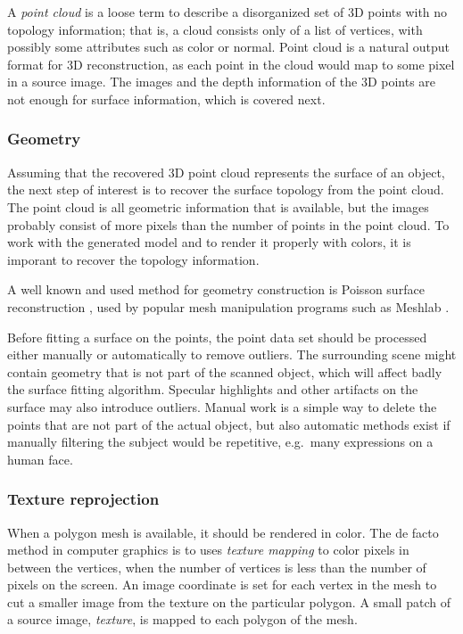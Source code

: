 A \emph{point cloud} is a loose term to describe a disorganized set of 3D points with no topology information; that is, a cloud consists only of a list of vertices, with possibly some attributes such as color or normal.
Point cloud is a natural output format for 3D reconstruction, as each point in the cloud would map to some pixel in a source image.
The images and the depth information of the 3D points are not enough for surface information, which is covered next.


\subsubsection{Geometry} %

Assuming that the recovered 3D point cloud represents the surface of an object, the next step of interest is to recover the surface topology from the point cloud.
The point cloud is all geometric information that is available, but the images probably consist of more pixels than the number of points in the point cloud.
To work with the generated model and to render it properly with colors, it is imporant to recover the topology information.

A well known and used method for geometry construction is Poisson surface reconstruction \cite{kazhdan2013screened}, used by popular mesh manipulation programs such as Meshlab \cite{meshlab}.

Before fitting a surface on the points, the point data set should be processed either manually or automatically to remove outliers.
The surrounding scene might contain geometry that is not part of the scanned object, which will affect badly the surface fitting algorithm.
Specular highlights and other artifacts on the surface may also introduce outliers.
Manual work is a simple way to delete the points that are not part of the actual object, but also automatic methods exist if manually filtering the subject would be repetitive, e.g.\ many expressions on a human face.



\subsubsection{Texture reprojection} %

When a polygon mesh is available, it should be rendered in color.
The de facto method in computer graphics is to uses \emph{texture mapping} to color pixels in between the vertices, when the number of vertices is less than the number of pixels on the screen.
An image coordinate is set for each vertex in the mesh to cut a smaller image from the texture on the particular polygon.
A small patch of a source image, \emph{texture}, is mapped to each polygon of the mesh.

